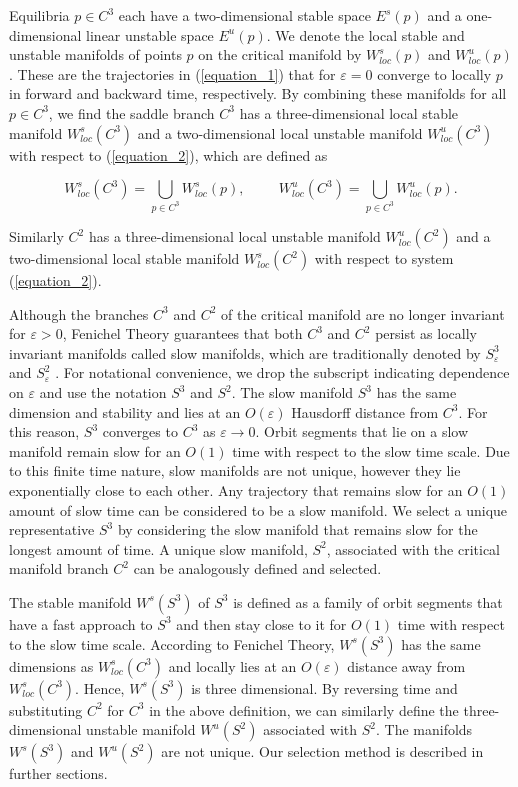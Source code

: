 \documentclass{ws-ijbc}
\begin{document}
Equilibria $p \in C^3$ each have a two-dimensional stable space $E^s(p)$ and a one-dimensional linear unstable space $E^u(p)$.  We denote the local stable and unstable manifolds of points $p$ on the critical manifold by $W^{s}_{loc}(p)$ and $W^{u}_{loc}(p)$.  These are the trajectories in (\ref{equation_1}) that for $\varepsilon = 0$ converge to locally $p$ in forward and backward time, respectively.  By combining these manifolds for all $p \in C^3$, we find the saddle branch $C^3$ has a three-dimensional local stable manifold $W^{s}_{loc}(C^3)$ and a two-dimensional local unstable manifold $W^{u}_{loc}(C^3)$ with respect to (\ref{equation_2}), which are defined as
    
$$W^{s}_{loc}(C^3) = \bigcup_{p \in C^3} W^{s}_{loc}(p), \hspace{1cm} W^{u}_{loc}(C^3) = \bigcup_{p \in C^3} W^{u}_{loc}(p).$$
    
\noindent
Similarly $C^2$ has a three-dimensional local unstable manifold $W^{u}_{loc}(C^2)$ and a two-dimensional local stable manifold $W^{s}_{loc}(C^2)$ with respect to system (\ref{equation_2}).

Although the branches $C^3$ and $C^2$ of the critical manifold are no longer invariant for $\varepsilon > 0$, Fenichel Theory guarantees that both $C^3$ and $C^2$ persist as locally invariant manifolds called slow manifolds, which are traditionally denoted by $S^3_\varepsilon$ and $S^2_\varepsilon$ \cite{Fenichel}.  For notational convenience, we drop the subscript indicating dependence on $\varepsilon$ and use the notation $S^3$ and $S^2$.  The slow manifold $S^3$ has the same dimension and stability and lies at an $O(\varepsilon)$ Hausdorff distance from $C^3$.  For this reason, $S^3$ converges to $C^3$ as $\varepsilon \rightarrow 0$.  Orbit segments that lie on a slow manifold remain slow for an $O(1)$ time with respect to the slow time scale.  Due to this finite time nature, slow manifolds are not unique, however they lie exponentially close to each other.  Any trajectory that remains slow for an $O(1)$ amount of slow time can be considered to be a slow manifold.  We select a unique representative $S^3$ by considering the slow manifold that remains slow for the longest amount of time.  A unique slow manifold, $S^2$, associated with the critical manifold branch $C^2$ can be analogously defined and selected.
    
The stable manifold $W^s(S^3)$ of $S^3$ is defined as a family of orbit segments that have a fast approach to $S^3$ and then stay close to it for $O(1)$ time with respect to the slow time scale.  According to Fenichel Theory, $W^{s}(S^3)$ has the same dimensions as $W^{s}_{loc}(C^3)$ and locally lies at an $O(\varepsilon)$ distance away from $W^{s}_{loc}(C^3)$.  Hence, $W^s(S^3)$ is three dimensional.  By reversing time and substituting $C^2$ for $C^3$ in the above definition, we can similarly define the three-dimensional unstable manifold $W^{u}(S^2)$ associated with $S^2$.  The manifolds $W^{s}(S^3)$ and $W^{u}(S^2)$ are not unique.  Our selection method is described in further sections.
 
\end{document}
